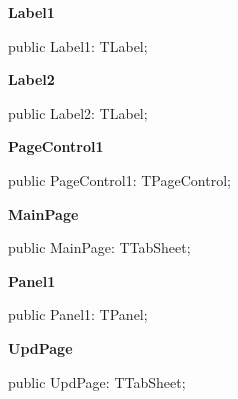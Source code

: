 \documentclass{report}
\newif\ifpdf
\begin{document}
\begin{list}{}
\par  \label{settings.TFmConfig-Label1}
\item[\textbf{Label1}\hfill]
\ifpdf
\begin{flushleft}
\fi
\begin{ttfamily}
public Label1: TLabel;\end{ttfamily}

\ifpdf
\end{flushleft}
\fi


\par  \label{settings.TFmConfig-Label2}
\item[\textbf{Label2}\hfill]
\ifpdf
\begin{flushleft}
\fi
\begin{ttfamily}
public Label2: TLabel;\end{ttfamily}

\ifpdf
\end{flushleft}
\fi


\par  \label{settings.TFmConfig-PageControl1}
\item[\textbf{PageControl1}\hfill]
\ifpdf
\begin{flushleft}
\fi
\begin{ttfamily}
public PageControl1: TPageControl;\end{ttfamily}

\ifpdf
\end{flushleft}
\fi


\par  \label{settings.TFmConfig-MainPage}
\item[\textbf{MainPage}\hfill]
\ifpdf
\begin{flushleft}
\fi
\begin{ttfamily}
public MainPage: TTabSheet;\end{ttfamily}

\ifpdf
\end{flushleft}
\fi


\par  \label{settings.TFmConfig-Panel1}
\item[\textbf{Panel1}\hfill]
\ifpdf
\begin{flushleft}
\fi
\begin{ttfamily}
public Panel1: TPanel;\end{ttfamily}

\ifpdf
\end{flushleft}
\fi


\par  \label{settings.TFmConfig-UpdPage}
\item[\textbf{UpdPage}\hfill]
\ifpdf
\begin{flushleft}
\fi
\begin{ttfamily}
public UpdPage: TTabSheet;\end{ttfamily}

\ifpdf
\end{flushleft}
\fi


\par  \end{list}
\end{document}
